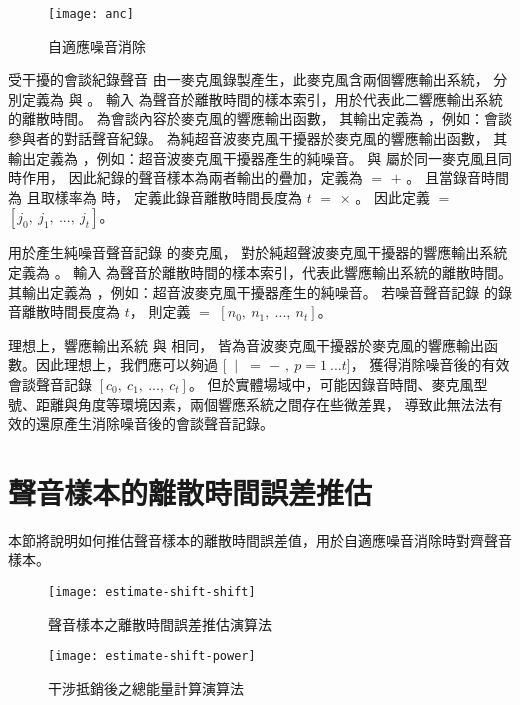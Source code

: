 \begin{figure}[H]
    \centering
    \texttt{[image: anc]}
    \caption{自適應噪音消除}\label{fig:anc}
\end{figure}

    受干擾的會談紀錄聲音 \DEFrecJ 由一麥克風錄製產生，此麥克風含兩個響應輸出系統，
分別定義為 \DEFfuncMicConv{\DEFpause} 與 \DEFfuncMicUSJ{\DEFpause}。
輸入 \DEFpause 為聲音於離散時間的樣本索引，用於代表此二響應輸出系統的離散時間。
\DEFfuncMicConv{\DEFpause} 為會談內容於麥克風的響應輸出函數，
其輸出定義為 \DEFmicConv，例如：會談參與者的對話聲音紀錄。
\DEFfuncMicUSJ{\DEFpause} 為純超音波麥克風干擾器於麥克風的響應輸出函數，
其輸出定義為 \DEFmicUSJ，例如：超音波麥克風干擾器產生的純噪音。
\DEFfuncMicConv{\DEFpause} 與 \DEFfuncMicUSJ{\DEFpause} 屬於同一麥克風且同時作用，
因此紀錄的聲音樣本為兩者輸出的疊加，定義為 \DEFmicRecJ $=$ \DEFmicConv $+$ \DEFmicUSJ。
且當錄音時間為 \DEFtimeREC 且取樣率為 \DEFsamplerate 時，
定義此錄音離散時間長度為 $t$ $=$ \DEFsamplerate $\times$ \DEFtimeREC。
因此定義 \DEFrecJ $=$ $[j_{0}, ~j_{1}, ~ ...,~ j_{t}]$。

    用於產生純噪音聲音記錄 \DEFrecN 的麥克風，
對於純超聲波麥克風干擾器的響應輸出系統定義為 \DEFfuncMicUSN{\DEFpause}。
輸入 \DEFpause 為聲音於離散時間的樣本索引，代表此響應輸出系統的離散時間。
\DEFfuncMicUSN{\DEFpause} 其輸出定義為 \DEFmicUSN ，例如：超音波麥克風干擾器產生的純噪音。
若噪音聲音記錄 \DEFrecN 的錄音離散時間長度為 $t$，
則定義 \DEFrecN $=$ $[n_{0}, ~n_{1}, ~ ...,~ n_{t}]$。

    理想上，響應輸出系統 \DEFfuncMicUSN{\DEFpause} 與 \DEFfuncMicUSJ{\DEFpause} 相同，
皆為音波麥克風干擾器於麥克風的響應輸出函數。因此理想上，我們應可以夠過
$[$ \DEFmicConv $~|~$ \DEFmicConv $=$ \DEFmicRecJ $-$ \DEFmicUSN $,~  p=1~...t]$，
獲得消除噪音後的有效會談聲音記錄 $[c_{0}, ~c_{1}, ~ ...,~ c_{t}]$。
但於實體場域中，可能因錄音時間、麥克風型號、距離與角度等環境因素，兩個響應系統之間存在些微差異，
導致此無法法有效的還原產生消除噪音後的會談聲音記錄。



\section{聲音樣本的離散時間誤差推估}\label{sec:estimate}

    本節將說明如何推估聲音樣本的離散時間誤差值，用於自適應噪音消除時對齊聲音樣本。

\begin{figure}[H]
    \centering
    \texttt{[image: estimate-shift-shift]}
    \caption{聲音樣本之離散時間誤差推估演算法}\label{fig:estimate-shift}
\end{figure}

\begin{figure}[H]
    \centering
    \texttt{[image: estimate-shift-power]}
    \caption{干涉抵銷後之總能量計算演算法}\label{fig:estimate-power}
\end{figure}

